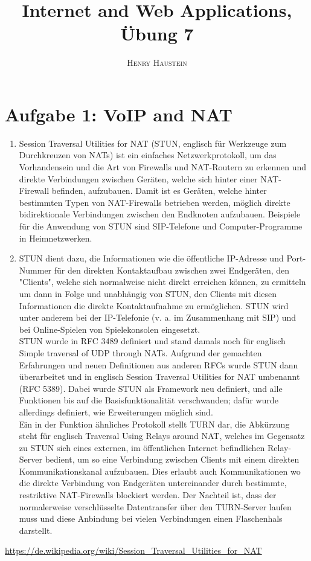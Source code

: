 \documentclass{article}
\title{\textbf{Internet and Web Applications, Übung 7}}
\author{\textsc{Henry Haustein}}
\date{}
\begin{document}
	\maketitle
	
	\section*{Aufgabe 1: VoIP and NAT}
	\begin{enumerate}[label=(\alph*)]
		\item Session Traversal Utilities for NAT (STUN, englisch für Werkzeuge zum Durchkreuzen von NATs) ist ein einfaches Netzwerkprotokoll, um das Vorhandensein und die Art von Firewalls und NAT-Routern zu erkennen und direkte Verbindungen zwischen Geräten, welche sich hinter einer NAT-Firewall befinden, aufzubauen. Damit ist es Geräten, welche hinter bestimmten Typen von NAT-Firewalls betrieben werden, möglich direkte bidirektionale Verbindungen zwischen den Endknoten aufzubauen. Beispiele für die Anwendung von STUN sind SIP-Telefone und Computer-Programme in Heimnetzwerken.
		\item STUN dient dazu, die Informationen wie die öffentliche IP-Adresse und Port-Nummer für den direkten Kontaktaufbau zwischen zwei Endgeräten, den "Clients", welche sich normalweise nicht direkt erreichen können, zu ermitteln um dann in Folge und unabhängig von STUN, den Clients mit diesen Informationen die direkte Kontaktaufnahme zu ermöglichen. STUN wird unter anderem bei der IP-Telefonie (v. a. im Zusammenhang mit SIP) und bei Online-Spielen von Spielekonsolen eingesetzt. \\
		STUN wurde in RFC 3489 definiert und stand damals noch für englisch Simple traversal of UDP through NATs. Aufgrund der gemachten Erfahrungen und neuen Definitionen aus anderen RFCs wurde STUN dann überarbeitet und in englisch Session Traversal Utilities for NAT umbenannt (RFC 5389). Dabei wurde STUN als Framework neu definiert, und alle Funktionen bis auf die Basisfunktionalität verschwanden; dafür wurde allerdings definiert, wie Erweiterungen möglich sind. \\
		Ein in der Funktion ähnliches Protokoll stellt TURN dar, die Abkürzung steht für englisch Traversal Using Relays around NAT, welches im Gegensatz zu STUN sich eines externen, im öffentlichen Internet befindlichen Relay-Server bedient, um so eine Verbindung zwischen Clients mit einem direkten Kommunikationskanal aufzubauen. Dies erlaubt auch Kommunikationen wo die direkte Verbindung von Endgeräten untereinander durch bestimmte, restriktive NAT-Firewalls blockiert werden. Der Nachteil ist, dass der normalerweise verschlüsselte Datentransfer über den TURN-Server laufen muss und diese Anbindung bei vielen Verbindungen einen Flaschenhals darstellt.
	\end{enumerate}
	\url{https://de.wikipedia.org/wiki/Session_Traversal_Utilities_for_NAT}
	
\end{document}
